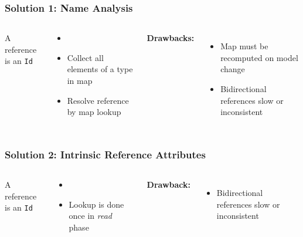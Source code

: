 \documentclass[aspectratio=169,9pt,english]{beamer}
\begin{document}
\begin{frame}[fragile]
	\frametitle{Solution 1: Name Analysis}
	\begin{columns}[T]
			A reference is an \texttt{Id}
  			\begin{itemize}
  				\item 
  				\item Collect all elements of a type in map
  				\item Resolve reference by map lookup
  			\end{itemize}
  			\vspace{1\baselineskip}
  			\textbf{Drawbacks:}
  			\begin{itemize}
  				\item Map must be recomputed on model change
  				\item Bidirectional references slow or inconsistent
  			\end{itemize}
			
			
		\end{columns}
\end{frame}

\begin{frame}[fragile]
	\frametitle{Solution 2: Intrinsic Reference Attributes}
	\begin{columns}[T]
			A reference is an \texttt{Id}
  			\begin{itemize}
  				\item  
  				\item Lookup is done once in \emph{read} phase
  			\end{itemize}
  			\vspace{1\baselineskip}
  			\textbf{Drawback:}
  			\begin{itemize}
  			  	\item Bidirectional references slow or inconsistent
  			\end{itemize}
%			
%			
		\end{columns}
\end{frame}
\end{document}
